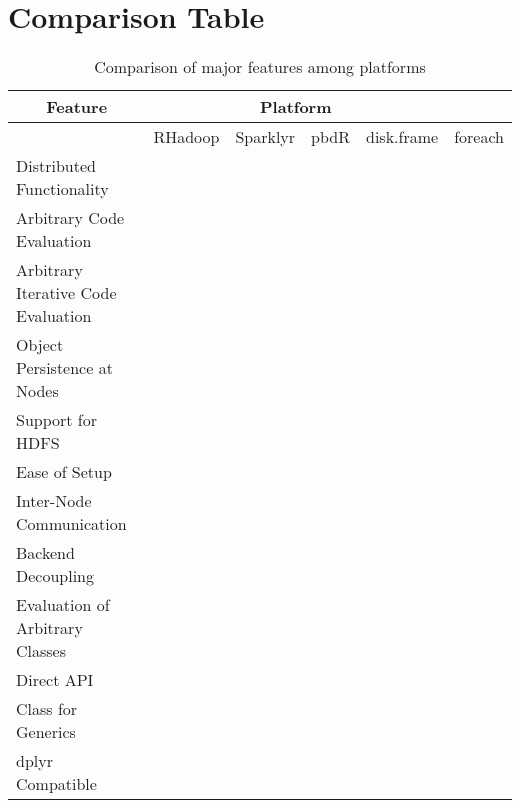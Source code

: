 \documentclass[a4paper,10pt]{article}
\begin{document}
\section{Comparison Table}\label{sec:comp-tab}

\begin{table}[h]
	\begin{tabular}{@{}llllll@{}}
		\toprule
		\multicolumn{1}{c}{Feature}         & \multicolumn{4}{c}{Platform} &                                        \\ \midrule
		                                    & RHadoop                      & Sparklyr & pbdR & disk.frame & foreach \\ \cmidrule(l){2-6}
		Distributed Functionality           &                              &          &      &            &         \\
		Arbitrary Code Evaluation           &                              &          &      &            &         \\
		Arbitrary Iterative Code Evaluation &                              &          &      &            &         \\
		Object Persistence at Nodes         &                              &          &      &            &         \\
		Support for HDFS                    &                              &          &      &            &         \\
		Ease of Setup                       &                              &          &      &            &         \\
		Inter-Node Communication            &                              &          &      &            &         \\
		Backend Decoupling                  &                              &          &      &            &         \\
		Evaluation of Arbitrary Classes     &                              &          &      &            &         \\
		Direct API                          &                              &          &      &            &         \\
		Class for Generics                  &                              &          &      &            &         \\
		dplyr Compatible                    &                              &          &      &            &         \\ \bottomrule
	\end{tabular}
	\caption{Comparison of major features among platforms\label{tab:compare-features}}
\end{table}
\end{document}
